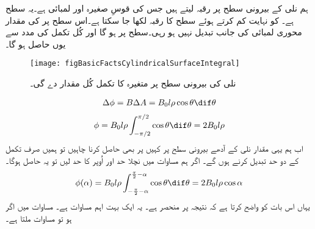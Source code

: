 	ہم نلی کے بیرونی سطح پر رقبہ   لیتے ہیں جس کی قوسِ صغیرہ   اور لمبائی  ہے۔یہ سطح  ہے۔ کو نہایت کم کرتے ہوئے سطح کا رقبہ  لکھا جا سکتا ہے۔اس سطح پر  کی مقدار محوری لمبائی  کی جانب تبدیل نہیں ہو رہی۔سطح   پر  ہو گا اور کُل  تکمل کی مدد سے یوں حاصل ہو گا۔
\begin{figure}
\centering
\texttt{[image: figBasicFactsCylindricalSurfaceIntegral]}
\caption{نلی کی بیرونی سطح پر متغیرہ کا تکمل کُل مقدار دے گی۔}
\label{شکل_حقائق_نلکی_سطحی_تکمل}
\end{figure}
%
\begin{align}
\Delta \phi=B \Delta A=B_0 l \rho \cos \theta \dif \theta
\end{align}
%
\begin{align}\label{مساوات_بنیادی_بہاو_بذریع_تکمل_زاویہ_صفر}
\phi = B_0 l \rho \int_{-\pi/2}^{\pi/2} \cos \theta \dif \theta =2 B_0 l \rho
\end{align}
اب ہم یہی مقدار نلی کے آدھے بیرونی سطح پر کہیں پر بھی حاصل کرنا چاہیں تو ہمیں صرف تکمل کے دو حد تبدیل کرنے ہوں گے۔  اگر ہم مساوات   میں نچلا حد  اور اُوپر کا حد  لیں تو یہ حاصل ہوگا۔
\begin{align}\label{مساوات_بنیادی_بہاو_بذریع_تکمل_کوئی_زاویہ}
\phi (\alpha) = B_0 l \rho \int_{-\frac{\pi}{2}-\alpha}^{\frac{\pi}{2}-\alpha} \cos \theta \dif \theta =2 B_0 l \rho \cos \alpha
\end{align}
یہاں   اس بات کو واضح کرتا ہے کہ نتیجہ  پر منحصر ہے۔ یہ ایک بہت اہم مساوات ہے۔ مساوات  میں  اگر  ہو تو مساوات    ملتا ہے۔

